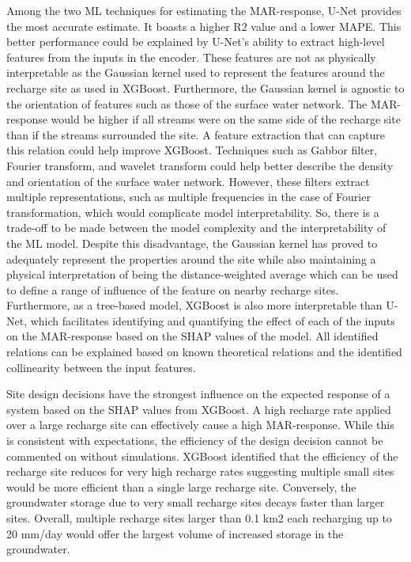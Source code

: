 \documentclass[
]{agujournal2019}
\begin{document}
Among the two ML techniques for estimating the MAR-response, U-Net
provides the most accurate estimate. It boasts a higher R2 value and a
lower MAPE. This better performance could be explained by U-Net's
ability to extract high-level features from the inputs in the encoder.
These features are not as physically interpretable as the Gaussian
kernel used to represent the features around the recharge site as used
in XGBoost. Furthermore, the Gaussian kernel is agnostic to the
orientation of features such as those of the surface water network. The
MAR-response would be higher if all streams were on the same side of the
recharge site than if the streams surrounded the site. A feature
extraction that can capture this relation could help improve XGBoost.
Techniques such as Gabbor filter, Fourier transform, and wavelet
transform could help better describe the density and orientation of the
surface water network. However, these filters extract multiple
representations, such as multiple frequencies in the case of Fourier
transformation, which would complicate model interpretability. So, there
is a trade-off to be made between the model complexity and the
interpretability of the ML model. Despite this disadvantage, the
Gaussian kernel has proved to adequately represent the properties around
the site while also maintaining a physical interpretation of being the
distance-weighted average which can be used to define a range of
influence of the feature on nearby recharge sites. Furthermore, as a
tree-based model, XGBoost is also more interpretable than U-Net, which
facilitates identifying and quantifying the effect of each of the inputs
on the MAR-response based on the SHAP values of the model. All
identified relations can be explained based on known theoretical
relations and the identified collinearity between the input features.

Site design decisions have the strongest influence on the expected
response of a system based on the SHAP values from XGBoost. A high
recharge rate applied over a large recharge site can effectively cause a
high MAR-response. While this is consistent with expectations, the
efficiency of the design decision cannot be commented on without
simulations. XGBoost identified that the efficiency of the recharge site
reduces for very high recharge rates suggesting multiple small sites
would be more efficient than a single large recharge site. Conversely,
the groundwater storage due to very small recharge sites decays faster
than larger sites. Overall, multiple recharge sites larger than 0.1 km2
each recharging up to 20 mm/day would offer the largest volume of
increased storage in the groundwater.
\end{document}
